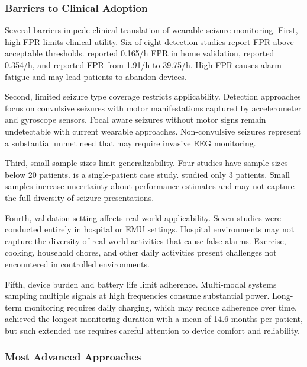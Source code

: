 \subsubsection{Barriers to Clinical Adoption}

Several barriers impede clinical translation of wearable seizure monitoring. First, high FPR limits clinical utility. Six of eight detection studies report FPR above acceptable thresholds. \textcite{dongTwoLayerEnsembleMethod2022} reported 0.165/h FPR in home validation, \textcite{wangEpilepticSeizureDetection2025} reported 0.354/h, and \textcite{reintjesECGBasedDetectionEpileptic2025} reported FPR from 1.91/h to 39.75/h. High FPR causes alarm fatigue and may lead patients to abandon devices.

Second, limited seizure type coverage restricts applicability. Detection approaches focus on convulsive seizures with motor manifestations captured by accelerometer and gyroscope sensors. Focal aware seizures without motor signs remain undetectable with current wearable approaches. Non-convulsive seizures represent a substantial unmet need that may require invasive EEG monitoring.

Third, small sample sizes limit generalizability. Four studies have sample sizes below 20 patients. \textcite{singhrathoreDevelopmentMultimodalMachine2024} is a single-patient case study. \textcite{borujenyDetectionEpilepticSeizure2013} studied only 3 patients. Small samples increase uncertainty about performance estimates and may not capture the full diversity of seizure presentations.

Fourth, validation setting affects real-world applicability. Seven studies were conducted entirely in hospital or EMU settings. Hospital environments may not capture the diversity of real-world activities that cause false alarms. Exercise, cooking, household chores, and other daily activities present challenges not encountered in controlled environments.

Fifth, device burden and battery life limit adherence. Multi-modal systems sampling multiple signals at high frequencies consume substantial power. Long-term monitoring requires daily charging, which may reduce adherence over time. \textcite{stirlingForecastingSeizureLikelihood2021} achieved the longest monitoring duration with a mean of 14.6 months per patient, but such extended use requires careful attention to device comfort and reliability.

\subsubsection{Most Advanced Approaches}

